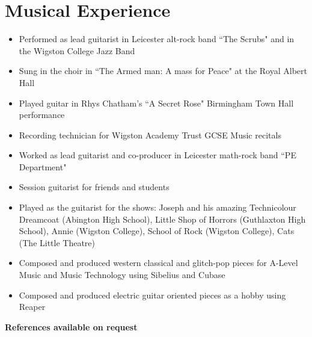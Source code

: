 \documentclass{article}
\begin{document}
\section{Musical Experience}
\begin{itemize}[noitemsep]

\renewcommand{\labelitemi}{$\square$}
\item Performed as lead guitarist in Leicester alt-rock band ``The Scrubs" and in the Wigston College Jazz Band
\item Sung in the choir in ``The Armed man: A mass for Peace" at the Royal Albert Hall
\item Played guitar in Rhys Chatham's ``A Secret Rose" Birmingham Town Hall performance
\item Recording technician for Wigston Academy Trust GCSE Music recitals
\item Worked as lead guitarist and co-producer in Leicester math-rock band ``PE Department"
\item Session guitarist for friends and students
\item Played as the guitarist for the shows: Joseph and his amazing Technicolour Dreamcoat (Abington High School),
Little Shop of Horrors (Guthlaxton High School), Annie (Wigston College), School of Rock (Wigston College), Cats (The Little Theatre)
\item Composed and produced western classical and glitch-pop pieces for A-Level Music and Music Technology using Sibelius and Cubase
\item Composed and produced electric guitar oriented pieces as a hobby using Reaper

\end{itemize}

\begin{center}

\vskip 0.5cm
\textbf{References available on request}

\end{center}
\end{document}
